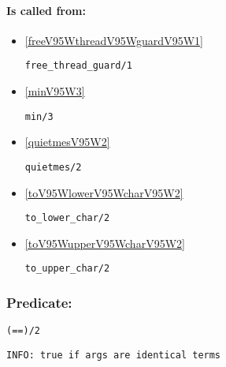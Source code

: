 \paragraph{Is called from:} 
\begin{itemize}
\item \ref{freeV95WthreadV95WguardV95W1} 
\begin{verbatim}
free_thread_guard/1
\end{verbatim}

\item \ref{minV95W3} 
\begin{verbatim}
min/3
\end{verbatim}

\item \ref{quietmesV95W2} 
\begin{verbatim}
quietmes/2
\end{verbatim}

\item \ref{toV95WlowerV95WcharV95W2} 
\begin{verbatim}
to_lower_char/2
\end{verbatim}

\item \ref{toV95WupperV95WcharV95W2} 
\begin{verbatim}
to_upper_char/2
\end{verbatim}

\end{itemize}

\subsubsection{Predicate:} \label{V61WV61WV95W2}

\begin{verbatim}
(==)/2
\end{verbatim}

{\small \begin{verbatim}
INFO: true if args are identical terms

\end{verbatim}}
